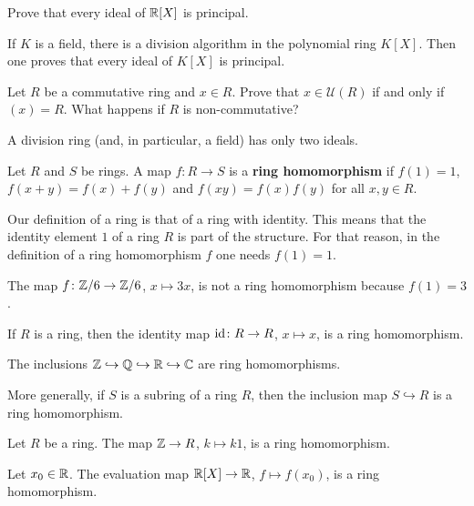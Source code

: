 \begin{exercise}
\label{xca:R[X]_principal}
	Prove that every ideal of $\mathbb{R}[X]$ is principal. 
\end{exercise}

If $K$ is a field, there is a division algorithm in the 
polynomial ring $K[X]$. Then one proves 
that every ideal of $K[X]$ is principal.  

\begin{exercise}
\label{xca:x_unit}
	Let $R$ be a commutative ring and $x\in R$. Prove that $x\in\mathcal{U}(R)$ if and only if
	$(x)=R$. What happens if $R$ is non-commutative?
\end{exercise}

A division ring (and, in particular, a field) has only two ideals. 

\begin{definition}
Let $R$ and $S$ be rings. A map $f\colon R\to S$ is a \textbf{ring homomorphism}  
if $f(1)=1$, $f(x+y)=f(x)+f(y)$ and $f(xy)=f(x)f(y)$ for all $x,y\in R$. 	
\end{definition}

Our definition of a ring is that of a ring with identity. This means
that the identity element $1$ of a ring $R$ 
is part of the structure. For that reason, in 
the definition
of a ring homomorphism $f$ one needs $f(1)=1$.  

\begin{example}
The map $f\colon\mathbb{Z}/6\to\mathbb{Z}/6$, $x\mapsto 3x$, is not a ring homomorphism because
$f(1)=3$. 	
\end{example}
 
If $R$ is a ring, then  
the identity map $\operatorname{id}\colon R\to R$, $x\mapsto x$, is a ring homomorphism. 	

\begin{example}
The inclusions $\mathbb{Z}\hookrightarrow\mathbb{Q}\hookrightarrow\mathbb{R}\hookrightarrow\mathbb{C}$ 
are ring homomorphisms. 	
\end{example}

More generally, if $S$ is a subring of a ring $R$, then the inclusion map 
$S\hookrightarrow R$ is a ring homomorphism. 

\begin{example}
Let $R$ be a ring. 
The map $\mathbb{Z}\to R$, $k\mapsto k1$, is a ring homomorphism. 	
\end{example}

\begin{example}
Let $x_0\in\mathbb{R}$. The evaluation map $\mathbb{R}[X]\to\mathbb{R}$, $f\mapsto f(x_0)$, 
is a ring homomorphism. 	
\end{example}

